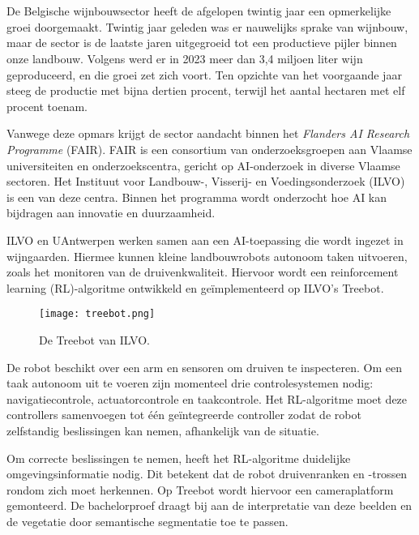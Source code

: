 
\chapter{}%
\label{ch:inleiding}

De Belgische wijnbouwsector heeft de afgelopen twintig jaar een opmerkelijke groei doorgemaakt.  Twintig jaar geleden was er nauwelijks sprake van wijnbouw, maar de sector is de laatste jaren uitgegroeid tot een productieve pijler binnen onze landbouw. Volgens \textcite{FODEconomie2024} werd er in 2023 meer dan 3,4 miljoen liter wijn geproduceerd, en die groei zet zich voort. Ten opzichte van het voorgaande jaar steeg de productie met bijna dertien procent, terwijl het aantal hectaren met elf procent toenam. 

Vanwege deze opmars krijgt de sector aandacht binnen het \textit{Flanders AI Research Programme} (FAIR). FAIR is een consortium van onderzoeksgroepen aan Vlaamse universiteiten en onderzoekscentra, gericht op AI-onderzoek in diverse Vlaamse sectoren. Het Instituut voor Landbouw-, Visserij- en Voedingsonderzoek (ILVO) is een van deze centra. Binnen het programma wordt onderzocht hoe AI kan bijdragen aan innovatie en duurzaamheid.

ILVO en UAntwerpen werken samen aan een AI-toepassing die wordt ingezet in wijngaarden. Hiermee kunnen kleine landbouwrobots autonoom taken uitvoeren, zoals het monitoren van de druivenkwaliteit. Hiervoor wordt een reinforcement learning (RL)-algoritme ontwikkeld en geïmplementeerd op ILVO's Treebot. \begin{figure}
    \centering
    \texttt{[image: treebot.png]}
    \caption[Treebot ILVO.]{\label{fig:treebot}De Treebot van ILVO.}
\end{figure}

De robot beschikt over een arm en sensoren om druiven te inspecteren. Om een taak autonoom uit te voeren zijn momenteel drie controlesystemen nodig: navigatiecontrole, actuatorcontrole en taakcontrole. Het RL-algoritme moet deze controllers samenvoegen tot één geïntegreerde controller zodat de robot zelfstandig beslissingen kan nemen, afhankelijk van de situatie.

Om correcte beslissingen te nemen, heeft het RL-algoritme duidelijke omgevingsinformatie nodig. Dit betekent dat de robot druivenranken en -trossen rondom zich moet herkennen. Op Treebot wordt hiervoor een cameraplatform gemonteerd. De bachelorproef draagt bij aan de interpretatie van deze beelden en de vegetatie door semantische segmentatie toe te passen.


